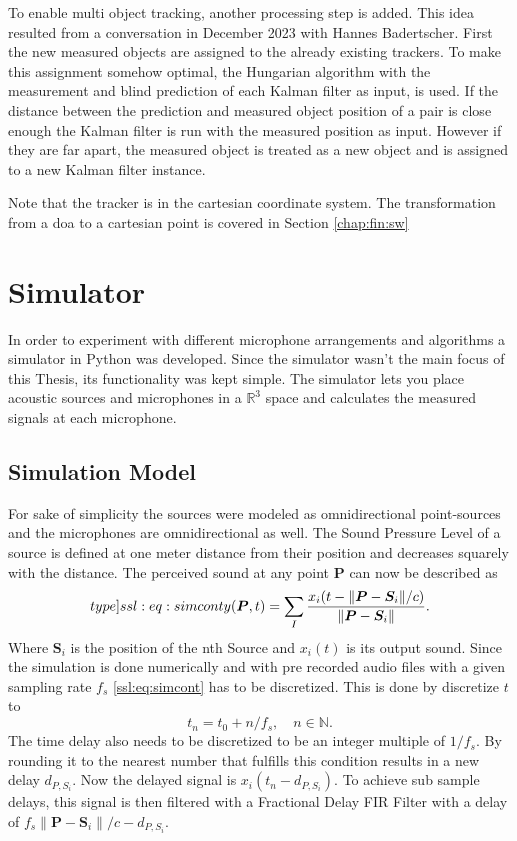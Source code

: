 To enable multi object tracking, another processing step is added.
This idea resulted from a conversation in December 2023 with 
Hannes Badertscher.
First the new measured objects are assigned to the already
existing trackers. 
To make this assignment somehow optimal, the Hungarian algorithm \cite{mathsem}
with the measurement and blind prediction of each Kalman filter as input, is used.
If the distance between the prediction and measured object position of a pair is close enough
the Kalman filter is run with the measured position as input.
However if they are far apart, the measured object is treated as a new object
and is assigned to a new Kalman filter instance.

Note that the tracker is in the cartesian coordinate system.
The transformation from a \acrshort{doa} to a cartesian point is
covered in Section \ref{chap:fin:sw}

\newpage
\section{Simulator}
In order to experiment with different microphone arrangements and algorithms a simulator in Python was developed.
Since the simulator wasn't the main focus of this Thesis, its functionality was kept simple.
The simulator lets you place acoustic sources and microphones in a $\mathbb{R}^3$ space and calculates
the measured signals at each microphone.

\subsection{Simulation Model}
For sake of simplicity the sources were modeled as omnidirectional point-sources and the
microphones are omnidirectional as well.
The Sound Pressure Level of a source is defined at one meter distance from their position and decreases
squarely with the distance.
The perceived sound at any point $\bm{P}$ can now be described as
\begin{equation}
	\label[type]{ssl:eq:simcont}
	y(\bm{P}, t) = 
	\sum_{I} \frac{
		x_i(t - \lVert \bm{P} - \bm{S}_i\rVert/c)}
		{\lVert \bm{P} - \bm{S}_i\rVert}.
\end{equation}
Where $\bm{S}_i$ is the position of the nth Source and $x_i(t)$ is its output sound.
Since the simulation is done numerically and with pre recorded audio files with a given
sampling rate $f_s$ \eqref{ssl:eq:simcont} has to be discretized.
This is done by discretize $t$ to
\begin{equation*}
	t_n = t_0 + n/f_s, \quad n \in \mathbb{N}.
\end{equation*}
The time delay also needs to be discretized to 
be an integer multiple of $1/f_s$.
By rounding it to the nearest number that fulfills this 
condition results in a new delay $d_{P,S_i}$.
Now the delayed signal is $x_i(t_n - d_{P,S_i})$.
To achieve sub sample delays, this signal is then filtered
with a Fractional Delay FIR Filter \cite{FracFil} with a delay of
$f_s \lVert \bm{P} - \bm{S}_i\rVert/c - d_{P,S_i}$.

